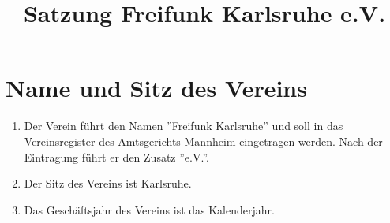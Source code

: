 \documentclass[12pt,a4paper,titlepage]{scrartcl}
\title{Satzung Freifunk Karlsruhe e.V.}
\begin{document}
\maketitle
{}
\thispagestyle{empty}
\newpage
{}
\setcounter{page}{1}

\section{Name und Sitz des Vereins}
\begin{enumerate}
\item Der Verein führt den Namen ''Freifunk Karlsruhe'' und soll in das Vereinsregister des Amtsgerichts Mannheim eingetragen werden. Nach der Eintragung führt er den Zusatz ''e.V.''.
\item Der Sitz des Vereins ist Karlsruhe.
\item Das Geschäftsjahr des Vereins ist das Kalenderjahr. 
\end{enumerate}
\end{document}
